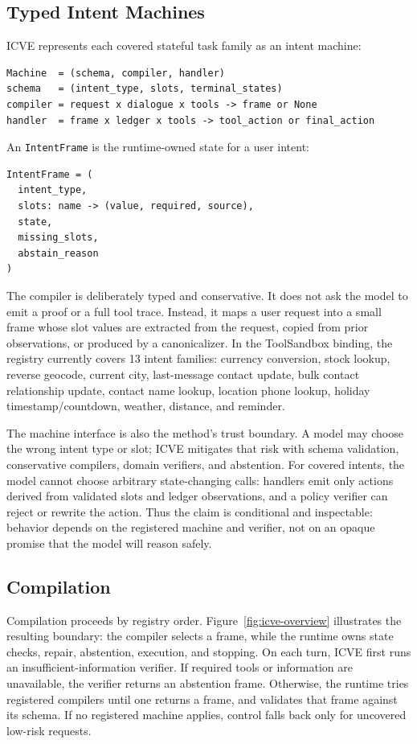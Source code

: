 \documentclass[11pt]{article}
\begin{document}
\subsection{Typed Intent Machines}

ICVE represents each covered stateful task family as an intent machine:
\begin{lstlisting}
Machine  = (schema, compiler, handler)
schema   = (intent_type, slots, terminal_states)
compiler = request x dialogue x tools -> frame or None
handler  = frame x ledger x tools -> tool_action or final_action
\end{lstlisting}

An \texttt{IntentFrame} is the runtime-owned state for a user intent:
\begin{lstlisting}
IntentFrame = (
  intent_type,
  slots: name -> (value, required, source),
  state,
  missing_slots,
  abstain_reason
)
\end{lstlisting}

The compiler is deliberately typed and conservative. It does not ask the model to emit a
proof or a full tool trace. Instead, it maps a user request into a small frame whose slot
values are extracted from the request, copied from prior observations, or produced by a
canonicalizer. In the ToolSandbox binding, the registry currently covers 13 intent
families: currency conversion, stock lookup, reverse geocode, current city, last-message
contact update, bulk contact relationship update, contact name lookup, location phone
lookup, holiday timestamp/countdown, weather, distance, and reminder.

The machine interface is also the method's trust boundary. A model may choose the wrong
intent type or slot; ICVE mitigates that risk with schema validation, conservative
compilers, domain verifiers, and abstention. For covered intents, the model cannot choose
arbitrary state-changing calls: handlers emit only actions derived from validated slots
and ledger observations, and a policy verifier can reject or rewrite the action. Thus the
claim is conditional and inspectable: behavior depends on the registered machine and
verifier, not on an opaque promise that the model will reason safely.

\subsection{Compilation}

Compilation proceeds by registry order. Figure~\ref{fig:icve-overview} illustrates the
resulting boundary: the compiler selects a frame, while the runtime owns state checks,
repair, abstention, execution, and stopping.
On each turn, ICVE first runs an insufficient-information verifier. If required tools or
information are unavailable, the verifier returns an abstention frame. Otherwise, the
runtime tries registered compilers until one returns a frame, and validates that frame
against its schema. If no registered machine applies, control falls back only for
uncovered low-risk requests.
\end{document}
